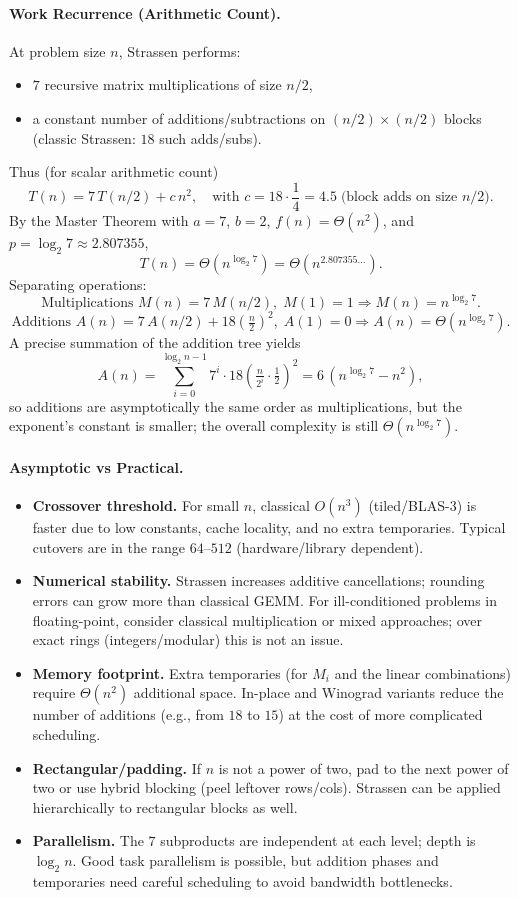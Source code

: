 \documentclass[9pt]{extarticle}
\begin{document}
\paragraph{Work Recurrence (Arithmetic Count).}
At problem size $n$, Strassen performs:
\begin{itemize}
  \item $7$ recursive matrix multiplications of size $n/2$,
  \item a constant number of additions/subtractions on $(n/2)\times(n/2)$ blocks (classic Strassen: $18$ such adds/subs).
\end{itemize}
Thus (for scalar arithmetic count)
\[
T(n)=7\,T(n/2)+c\,n^2,\quad \text{with } c=18\cdot\frac{1}{4}=4.5 \;\text{(block adds on size }n/2).
\]
By the Master Theorem with $a=7$, $b=2$, $f(n)=\Theta(n^2)$, and $p=\log_2 7\approx 2.807355$,
\[
T(n)=\Theta\!\left(n^{\log_2 7}\right)=\Theta\!\left(n^{2.807355\dots}\right).
\]
Separating operations:
\[
\text{Multiplications }M(n)=7\,M(n/2),\; M(1)=1 \Rightarrow M(n)=n^{\log_2 7}.
\]
\[
\text{Additions }A(n)=7\,A(n/2)+18\left(\tfrac{n}{2}\right)^2,\; A(1)=0
\Rightarrow A(n)=\Theta\!\left(n^{\log_2 7}\right).
\]
A precise summation of the addition tree yields
\[
A(n)=\sum_{i=0}^{\log_2 n -1}\! 7^i \cdot 18\left(\tfrac{n}{2^i}\cdot\tfrac{1}{2}\right)^2
= 6\,(n^{\log_2 7}-n^2),
\]
so additions are asymptotically the same order as multiplications, but the exponent’s constant is smaller; the overall complexity is still $\Theta(n^{\log_2 7})$.

\paragraph{Asymptotic vs Practical.}
\begin{itemize}
  \item \textbf{Crossover threshold.} For small $n$, classical $O(n^3)$ (tiled/BLAS-3) is faster due to low constants, cache locality, and no extra temporaries. Typical cutovers are in the range $64$–$512$ (hardware/library dependent).
  \item \textbf{Numerical stability.} Strassen increases additive cancellations; rounding errors can grow more than classical GEMM. For ill-conditioned problems in floating-point, consider classical multiplication or mixed approaches; over exact rings (integers/modular) this is not an issue.
  \item \textbf{Memory footprint.} Extra temporaries (for $M_i$ and the linear combinations) require $\Theta(n^2)$ additional space. In-place and Winograd variants reduce the number of additions (e.g., from $18$ to $15$) at the cost of more complicated scheduling.
  \item \textbf{Rectangular/padding.} If $n$ is not a power of two, pad to the next power of two or use hybrid blocking (peel leftover rows/cols). Strassen can be applied hierarchically to rectangular blocks as well.
  \item \textbf{Parallelism.} The $7$ subproducts are independent at each level; depth is $\log_2 n$. Good task parallelism is possible, but addition phases and temporaries need careful scheduling to avoid bandwidth bottlenecks.
\end{itemize}
\end{document}
